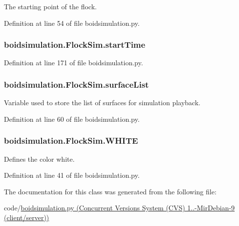 The starting point of the flock. 



Definition at line 54 of file boidsimulation.\-py.

\hypertarget{classboidsimulation_1_1FlockSim_aea78473e0e592e48b6047f49f8254cc1}{
\subsubsection[{start\-Time}]{\setlength{\rightskip}{0pt plus 5cm}boidsimulation.\-Flock\-Sim.\-start\-Time}}\label{classboidsimulation_1_1FlockSim_aea78473e0e592e48b6047f49f8254cc1}


Definition at line 171 of file boidsimulation.\-py.

\hypertarget{classboidsimulation_1_1FlockSim_a60f47dc6f8186030cd22f3ca3b37c4e6}{
\subsubsection[{surface\-List}]{\setlength{\rightskip}{0pt plus 5cm}boidsimulation.\-Flock\-Sim.\-surface\-List}}\label{classboidsimulation_1_1FlockSim_a60f47dc6f8186030cd22f3ca3b37c4e6}


Variable used to store the list of surfaces for simulation playback. 



Definition at line 60 of file boidsimulation.\-py.

\hypertarget{classboidsimulation_1_1FlockSim_afe8d83a914aeae9d188cdf61053de56c}{
\subsubsection[{W\-H\-I\-T\-E}]{\setlength{\rightskip}{0pt plus 5cm}boidsimulation.\-Flock\-Sim.\-W\-H\-I\-T\-E}}\label{classboidsimulation_1_1FlockSim_afe8d83a914aeae9d188cdf61053de56c}


Defines the color white. 



Definition at line 41 of file boidsimulation.\-py.



The documentation for this class was generated from the following file\-:\begin{DoxyCompactItemize}
\item 
code/\hyperlink{boidsimulation_8py}{boidsimulation.\-py (\-Concurrent Versions System (\-C\-V\-S) 1..-\/\-Mir\-Debian-\/9 (client/server))}\end{DoxyCompactItemize}
